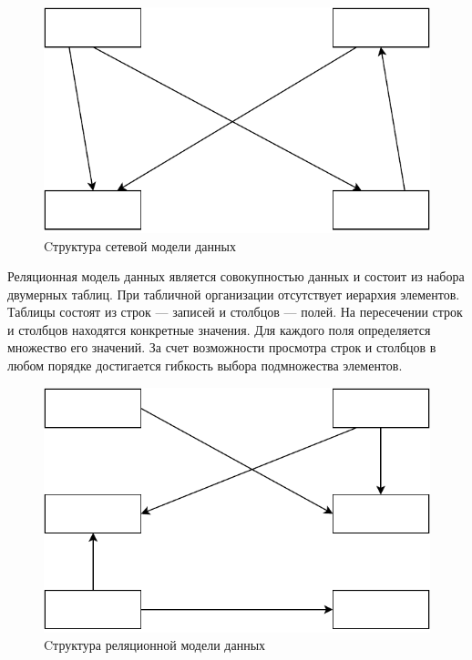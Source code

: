 \begin{figure}[h!]
	\begin{center}
		\includegraphics[scale=0.6]{assets/bd_scheme_2.pdf}
	\end{center}
	\caption{Cтруктура сетевой модели данных}
	\label{bd_scheme_2}
\end{figure}

Реляционная модель данных является совокупностью данных и состоит из набора двумерных таблиц. При табличной организации отсутствует иерархия элементов. Таблицы состоят из строк --- записей и столбцов --- полей. На пересечении строк и столбцов находятся конкретные значения. Для каждого поля определяется множество его значений. За счет возможности просмотра строк и столбцов в любом порядке достигается гибкость выбора подмножества элементов.


\begin{figure}[h!]
	\begin{center}
		\includegraphics[scale=0.6]{assets/bd_scheme_3.pdf}
	\end{center}
	\caption{Cтруктура реляционной модели данных}
	\label{bd_scheme_3}
\end{figure}

